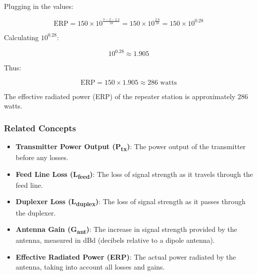 Plugging in the values:

\[
\text{ERP} = 150 \times 10^{\frac{7 - 2 - 2.2}{10}} = 150 \times 10^{\frac{2.8}{10}} = 150 \times 10^{0.28}
\]

Calculating \( 10^{0.28} \):

\[
10^{0.28} \approx 1.905
\]

Thus:

\[
\text{ERP} = 150 \times 1.905 \approx 286 \text{ watts}
\]

The effective radiated power (ERP) of the repeater station is approximately 286 watts.

\subsubsection{Related Concepts}
\begin{itemize}
    \item \textbf{Transmitter Power Output (P\textsubscript{tx})}: The power output of the transmitter before any losses.
    \item \textbf{Feed Line Loss (L\textsubscript{feed})}: The loss of signal strength as it travels through the feed line.
    \item \textbf{Duplexer Loss (L\textsubscript{duplex})}: The loss of signal strength as it passes through the duplexer.
    \item \textbf{Antenna Gain (G\textsubscript{ant})}: The increase in signal strength provided by the antenna, measured in dBd (decibels relative to a dipole antenna).
    \item \textbf{Effective Radiated Power (ERP)}: The actual power radiated by the antenna, taking into account all losses and gains.
\end{itemize}

